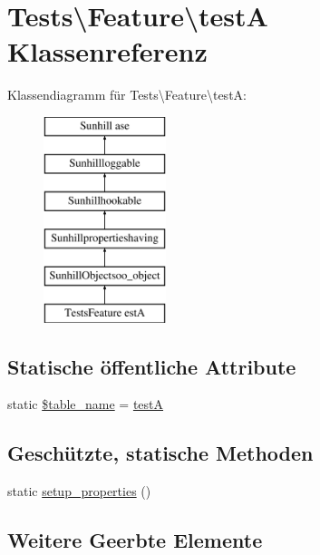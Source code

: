 \hypertarget{classTests_1_1Feature_1_1testA}{}\section{Tests\textbackslash{}Feature\textbackslash{}testA Klassenreferenz}
\label{classTests_1_1Feature_1_1testA}
Klassendiagramm für Tests\textbackslash{}Feature\textbackslash{}testA\+:\begin{figure}[H]
\begin{center}
\leavevmode
\includegraphics[height=6.000000cm]{dd/d43/classTests_1_1Feature_1_1testA}
\end{center}
\end{figure}
\subsection*{Statische öffentliche Attribute}
\begin{DoxyCompactItemize}
\item 
static \hyperlink{classTests_1_1Feature_1_1testA_aa226d4ae1f7cfdc676a8478700b97ccc}{\$table\+\_\+name} = \textquotesingle{}\hyperlink{classTests_1_1Feature_1_1testA}{testA}\textquotesingle{}
\end{DoxyCompactItemize}
\subsection*{Geschützte, statische Methoden}
\begin{DoxyCompactItemize}
\item 
static \hyperlink{classTests_1_1Feature_1_1testA_a4a7d8acab1d180028f4ac16e432b65c8}{setup\+\_\+properties} ()
\end{DoxyCompactItemize}
\subsection*{Weitere Geerbte Elemente}


